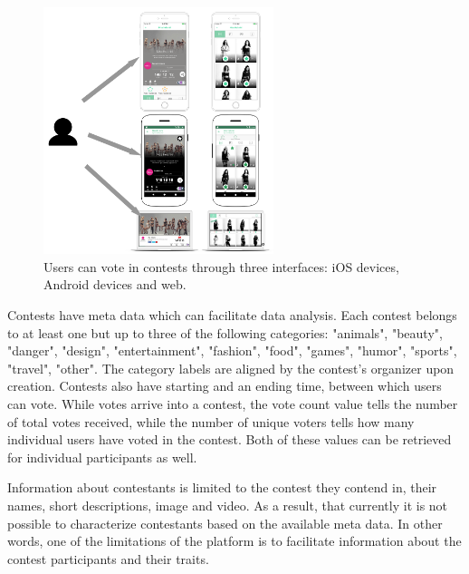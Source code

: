     \begin{figure}[h]
        \begin{center}
            \includegraphics[width=0.6\textwidth]{images/choicely_platforms.png}
            \caption{Users can vote in contests through three interfaces: iOS devices, Android devices and web.}
            \label{choicely_platforms}
        \end{center}
    \end{figure} 

    Contests have meta data which can facilitate data analysis. Each contest belongs to at least one but up to three of the following categories: "animals", "beauty", "danger", "design", "entertainment", "fashion", "food", "games", "humor", "sports", "travel", "other". The category labels are aligned by the contest's organizer upon creation. Contests also have starting and an ending time, between which users can vote. While votes arrive into a contest, the vote count value tells the number of total votes received, while the number of unique voters tells how many individual users have voted in the contest. Both of these values can be retrieved for individual participants as well. 

    Information about contestants is limited to the contest they contend in, their names, short descriptions, image and video. As a result, that currently it is not possible to characterize contestants based on the available meta data. In other words, one of the limitations of the platform is to facilitate information about the contest participants and their traits. 
    
